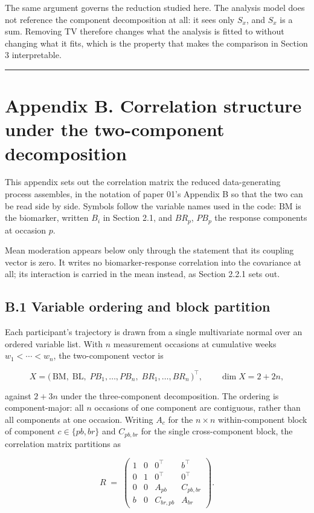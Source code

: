 \documentclass[
  11pt,
]{article}
\begin{document}
The same argument governs the reduction studied here. The analysis
model does not reference the component decomposition at all: it sees
only \(S_x\), and \(S_x\) is a sum. Removing TV therefore changes what
the analysis is fitted to without changing what it fits, which is the
property that makes the comparison in Section 3 interpretable.

\bigskip\noindent

\rule{\textwidth}{0.4pt}\bigskip

\section{Appendix B. Correlation structure under the two-component
decomposition}

This appendix sets out the correlation matrix the reduced
data-generating process assembles, in the notation of paper 01's
Appendix B so that the two can be read side by side. Symbols follow
the variable names used in the code: \(\mathrm{BM}\) is the biomarker,
written \(B_i\) in Section 2.1, and \(BR_p\), \(PB_p\) the response
components at occasion \(p\).

Mean moderation appears below only through the statement that its
coupling vector is zero. It writes no biomarker-response correlation
into the covariance at all; its interaction is carried in the mean
instead, as Section 2.2.1 sets out.

\subsection{B.1 Variable ordering and block partition}

Each participant's trajectory is drawn from a single multivariate
normal over an ordered variable list. With \(n\) measurement occasions
at cumulative weeks \(w_1 < \cdots < w_n\), the two-component vector is

\[
X = \bigl(\,\mathrm{BM},\; \mathrm{BL},\;
PB_1,\dots,PB_n,\;
BR_1,\dots,BR_n \,\bigr)^{\!\top},
\qquad \dim X = 2 + 2n ,
\]

against \(2 + 3n\) under the three-component decomposition. The
ordering is component-major: all \(n\) occasions of one component are
contiguous, rather than all components at one occasion. Writing \(A_c\)
for the \(n \times n\) within-component block of component \(c \in
\{pb, br\}\) and \(C_{pb,br}\) for the single cross-component block, the
correlation matrix partitions as

\[
R \;=\;
\begin{pmatrix}
1 & 0 & 0^{\top}   & b^{\top} \\[2pt]
0 & 1 & 0^{\top}   & 0^{\top} \\[2pt]
0 & 0 & A_{pb}     & C_{pb,br} \\[2pt]
b & 0 & C_{br,pb}  & A_{br}
\end{pmatrix}.
\]
\end{document}
